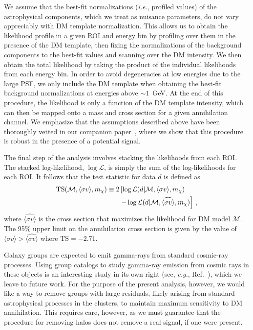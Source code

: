 We assume that the best-fit normalizations (\emph{i.e.}, profiled values) of the astrophysical components, which we treat as nuisance parameters, do not vary appreciably with DM template normalization. This allows us to obtain the likelihood profile in a given ROI and energy bin by profiling over them in the presence of the DM template, then fixing the normalizations of the background components to the best-fit values and scanning over the DM intensity. We then obtain the total likelihood by taking the product of the individual likelihoods from each energy bin. In order to avoid degeneracies at low energies due to the large PSF, we only include the DM template when obtaining the best-fit background normalizations at energies above $\sim$$1$~GeV. At the end of this procedure, the likelihood is only a function of the DM template intensity, which can then be mapped onto a mass and cross section for a given annihilation channel. We emphasize that the assumptions described above have been thoroughly vetted in our companion paper~\cite{companion}, where we show that this procedure is robust in the presence of a potential signal.

The final step of the analysis involves stacking the likelihoods from each ROI. The stacked log-likelihood, $\log \mathcal{L}$, is simply the sum of the log-likelihoods for each ROI.  It follows that the test statistic for data $d$ is defined as
 \begin{equation}\begin{aligned}
{\rm TS}(\mathcal{M}, \langle\sigma v\rangle, m_\chi) \equiv 2 &\left[ \log \mathcal{L}(d | \mathcal{M}, \langle\sigma v\rangle, m_\chi ) \right.\\
&\left.- \log \mathcal{L}(d | \mathcal{M}, \widehat{\langle\sigma v\rangle}, m_\chi ) \right]\,,
\label{eq:TSdef}
\end{aligned}\end{equation}
where $\widehat{\langle\sigma v\rangle}$ is the cross section that maximizes the likelihood for DM model $\mathcal{M}$.    The 95\% upper limit on the annihilation cross section is given by the value of $\langle\sigma v\rangle > \widehat{\langle \sigma v\rangle}$ where $\text{TS}=-2.71$.

Galaxy groups are expected to emit gamma-rays from standard cosmic-ray processes.  Using group catalogs to study gamma-ray emission from cosmic rays in these objects is an interesting study in its own right (see, {\it e.g.}, Ref.~\cite{Jeltema:2008vu,Huber:2013cia,Ackermann:2015fdi,Rephaeli:2015nca}), which we leave to future work.  For the purpose of the present analysis, however, we would like a way to remove groups with large residuals, likely arising from standard astrophysical processes in the clusters, to maintain maximum sensitivity to DM annihilation.  This requires care, however, as we must guarantee  that the procedure for removing halos does not remove a real signal, if one were present.  

